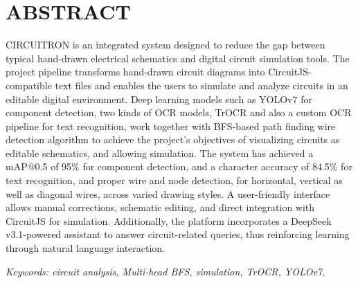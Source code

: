 

\chapter*{ABSTRACT}
{}


\bigskip
CIRCUITRON is an integrated system designed to reduce the gap between typical hand-drawn electrical schematics and digital circuit simulation tools. The project pipeline transforms hand-drawn circuit 
diagrams into CircuitJS-compatible text files and enables the users to simulate and analyze circuits in an editable digital environment. Deep learning models such as YOLOv7 for component detection, two kinds of OCR models, TrOCR and also a custom OCR pipeline for text 
recognition, work together with BFS-based path finding wire detection algorithm to achieve the project's objectives of visualizing circuits as editable schematics, and allowing simulation. The system has achieved a mAP@0.5 of 95\% for component detection, and a character accuracy of 84.5\% for 
text recognition, and proper wire and node detection, for horizontal, vertical as well as diagonal wires, 
across varied drawing styles. A user-friendly interface allows manual corrections, 
schematic editing, and direct integration with CircuitJS for simulation. Additionally, the 
platform incorporates a DeepSeek v3.1-powered assistant to answer circuit-related queries, thus 
reinforcing learning through natural language interaction.

\vspace{1em}
\noindent\textit{Keywords: circuit analysis, Multi-head BFS, simulation, TrOCR, YOLOv7.}